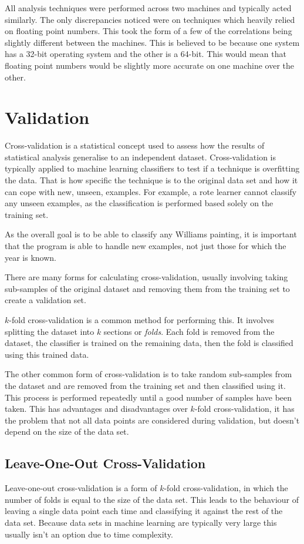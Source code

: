 All analysis techniques were performed across two machines and typically acted similarly. The only
discrepancies noticed were on techniques which heavily relied on floating point numbers. This took the form of 
a few of the correlations being slightly different between the machines. This is believed to be because 
one system has a 32-bit operating system and the other is a 64-bit. This would mean that 
floating point numbers would be slightly more accurate on one machine over the other.


\section{Validation}
Cross-validation is a statistical concept used to assess how the results of statistical analysis
generalise to an independent dataset. Cross-validation is typically applied to machine learning
classifiers to test if a technique is overfitting the data. That is how specific the technique is
to the original data set and how it can cope with new, unseen, examples. For example, a rote learner cannot
classify any unseen examples, as the classification is performed based solely on the training set.

As the overall goal is to be able to classify any Williams painting, it is important that the 
program is able to handle new examples, not just those for which the year is known.

There are many forms for calculating cross-validation, usually involving taking sub-samples of the
original dataset and removing them from the training set to create a validation set.

$k$-fold cross-validation is a common method for performing this. It involves splitting the dataset 
into $k$ sections or \emph{folds}. Each fold is removed from the dataset, the classifier is
trained on the remaining data, then the fold is classified using this trained data. 

The other common form of cross-validation is to take random sub-samples from the dataset and are
removed from the training set and then classified using it. This process is performed repeatedly
until a good number of samples have been taken. This has advantages and disadvantages over $k$-fold
cross-validation, it has the problem that not all data points are considered during validation,
but doesn't depend on the size of the data set.


\subsection{Leave-One-Out Cross-Validation}
Leave-one-out cross-validation is a form of $k$-fold cross-validation, in which the number of folds
is equal to the size of the data set. This leads to the behaviour of leaving a single data point
each time and classifying it against the rest of the data set. Because data sets in machine 
learning are typically very large this usually isn't an option due to time complexity.

